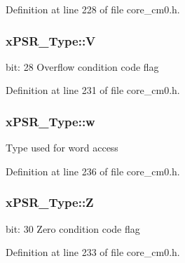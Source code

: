 Definition at line 228 of file core\-\_\-cm0.\-h.

\hypertarget{unionx_p_s_r___type_af14df16ea0690070c45b95f2116b7a0a}{
\subsubsection[{V}]{ x\-P\-S\-R\-\_\-\-Type\-::\-V}}\label{unionx_p_s_r___type_af14df16ea0690070c45b95f2116b7a0a}
bit\-: 28 Overflow condition code flag 

Definition at line 231 of file core\-\_\-cm0.\-h.

\hypertarget{unionx_p_s_r___type_a1a47176768f45f79076c4f5b1b534bc2}{
\subsubsection[{w}]{ x\-P\-S\-R\-\_\-\-Type\-::w}}\label{unionx_p_s_r___type_a1a47176768f45f79076c4f5b1b534bc2}
Type used for word access 

Definition at line 236 of file core\-\_\-cm0.\-h.

\hypertarget{unionx_p_s_r___type_a1e5d9801013d5146f2e02d9b7b3da562}{
\subsubsection[{Z}]{ x\-P\-S\-R\-\_\-\-Type\-::\-Z}}\label{unionx_p_s_r___type_a1e5d9801013d5146f2e02d9b7b3da562}
bit\-: 30 Zero condition code flag 

Definition at line 233 of file core\-\_\-cm0.\-h.



